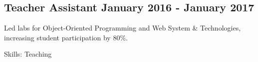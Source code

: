 \subsection{{Teacher Assistant \hfill January 2016 - January 2017}}
\begin{zitemize}

\item Led labs for Object-Oriented Programming and Web System \& Technologies, increasing student participation by 80\%.

\item[] Skills: Teaching
\end{zitemize}
